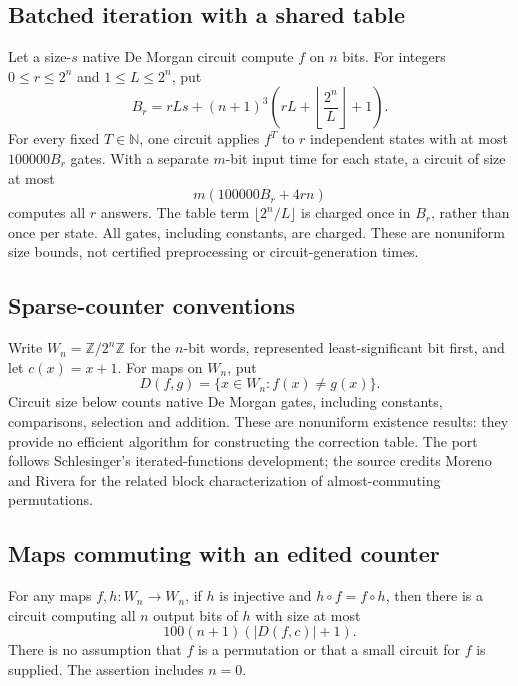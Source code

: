 \begin{result}
\subsection{Batched iteration with a shared table}
Let a size-$s$ native De Morgan circuit compute $f$ on $n$ bits. For integers
$0\le r\le2^n$ and $1\le L\le2^n$, put
\[
B_r=rLs+(n+1)^3\left(rL+\left\lfloor\frac{2^n}{L}\right\rfloor+1\right).
\]
For every fixed $T\in\mathbb N$, one circuit applies $f^T$ to $r$ independent
states with at most $100000B_r$ gates. With a separate $m$-bit input time for
each state, a circuit of size at most
\[
m(100000B_r+4rn)
\]
computes all $r$ answers. The table term $\lfloor2^n/L\rfloor$ is charged once
in $B_r$, rather than once per state. All gates, including constants, are
charged. These are nonuniform size bounds, not certified preprocessing or
circuit-generation times.\citep{Schlesinger2026IteratedFunctions}
\end{result}

\begin{result}
\subsection*{Sparse-counter conventions}
Write $W_n=\mathbb Z/2^n\mathbb Z$ for the $n$-bit words, represented
least-significant bit first, and let $c(x)=x+1$. For maps on $W_n$, put
\[
D(f,g)=\{x\in W_n:f(x)\ne g(x)\}.
\]
Circuit size below counts native De Morgan gates, including constants,
comparisons, selection and addition. These are nonuniform existence results:
they provide no efficient algorithm for constructing the correction table.
The port follows Schlesinger's iterated-functions development; the source credits Moreno and Rivera for the related block characterization
of almost-commuting permutations.
\citep{Schlesinger2026IteratedFunctions,MorenoRivera2016}
\end{result}

\begin{result}
\subsection{Maps commuting with an edited counter}
For any maps $f,h:W_n\to W_n$, if $h$ is injective and $h\circ f=f\circ h$, then
there is a circuit computing all $n$ output bits of $h$ with size at most
\[
100(n+1)(|D(f,c)|+1).
\]
There is no assumption that $f$ is a permutation or that a small circuit for $f$
is supplied. The assertion includes $n=0$.
\end{result}

